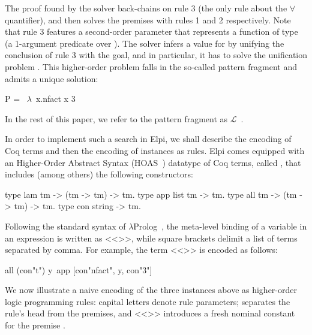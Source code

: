 \documentclass[sigconf,natbib=false,review]{acmart}
\newcommand{\llambda}{\ensuremath{\mathcal{L}}\xspace}
\begin{document}
\noindent
The proof found by the solver back-chains on rule 3 (the only rule
about the $\forall$ quantifier), and then solves the premises with
rules 1 and 2 respectively.
Note that rule 3 features a second-order parameter  that represents
a function of type  (a 1-argument predicate over ).
The solver infers a value for  by unifying the conclusion
of rule 3 with the goal, and in particular, it has to solve the unification
problem . This higher-order problem falls in the so-called 
pattern fragment and admits a unique solution:
\begin{elpicode}
P = ~$\lambda$~x.nfact x 3                                       ~~
\end{elpicode}
In the rest of this paper, we refer to the pattern fragment as
\llambda~\cite{miller1991}.

In order to implement such a search in Elpi, we shall describe the encoding
of Coq terms and then the encoding of instances as rules.
Elpi comes equipped with
an Higher-Order Abstract Syntax (HOAS~\cite{10.1145/53990.54010}) datatype of
Coq terms, called , that includes (among others) the following
constructors:

\begin{elpicode}
type lam  tm -> (tm -> tm) -> tm.     %
type app  list tm -> tm.              %
type all  tm -> (tm -> tm) -> tm.     %
type con  string -> tm.               %
\end{elpicode}

\noindent
Following the standard syntax of $\lambda$Prolog~\cite{miller_nadathur_2012},
the meta-level binding of a variable  in an expression
 is written as <<>>, while square brackets delimit a
list of terms separated by comma. For example, the term
<<>> is encoded as follows:

\begin{elpicode}
all (con"t") y\ app [con"nfact", y, con"3"]
\end{elpicode}

\noindent
We now illustrate a naive encoding of the three instances above as higher-order
logic programming rules: capital letters denote rule
parameters; \elpiIn{:-} separates the rule's head from the premises, and
<<>> introduces a fresh nominal constant 
for the premise .
\end{document}
